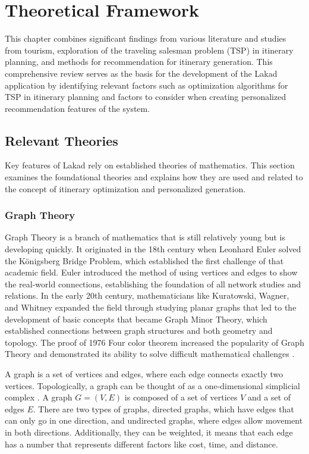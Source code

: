 \chapter{Theoretical Framework}
\thispagestyle{empty}
This chapter combines significant findings from various literature and studies from tourism, exploration of the traveling salesman problem (TSP) in itinerary planning, and methods for recommendation for itinerary generation. This comprehensive review serves as the basis for the development of the Lakad application by identifying relevant factors such as optimization algorithms for TSP in itinerary planning and factors to consider when creating personalized recommendation features of the system.

\section{Relevant Theories}
Key features of Lakad rely on established theories of mathematics. This section examines the foundational theories and explains how they are used and related to the concept of itinerary optimization and personalized generation.

\subsection{Graph Theory}
Graph Theory is a branch of mathematics that is still relatively young but is developing quickly. It originated in the 18th century when Leonhard Euler solved the Königsberg Bridge Problem, which established the first challenge of that academic field. Euler introduced the method of using vertices and edges to show the real-world connections, establishing the foundation of all network studies and relations. In the early 20th century, mathematicians like Kuratowski, Wagner, and Whitney expanded the field through studying planar graphs that led to the development of basic concepts that became Graph Minor Theory, which established connections between graph structures and both geometry and topology. The proof of 1976 Four color theorem increased the popularity of Graph Theory and demonstrated its ability to solve difficult mathematical challenges \parencite{Carmesin2022}.

A graph is a set of vertices and edges, where each edge connects exactly two vertices. Topologically, a graph can be thought of as a one-dimensional simplicial complex \parencite{Carmesin2022}. A graph $G=(V,E)$ is composed of a set of vertices $V$ and a set of edges $E$. There are two types of graphs, directed graphs, which have edges that can only go in one direction, and undirected graphs, where edges allow movement in both directions. Additionally, they can be weighted, it means that each edge has a number that represents different factors like cost, time, and distance.

